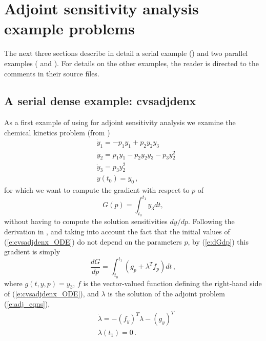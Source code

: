 \section{Adjoint sensitivity analysis example problems}\label{s:adj_examples}

The next three sections describe in detail a serial example () and
two parallel examples ( and ). For details on the other
examples, the reader is directed to the comments in their source files.

\subsection{A serial dense example: cvsadjdenx}\label{ss:cvsadjdenx}

As a first example of using {\cvodes} for adjoint sensitivity analysis
we examine the chemical kinetics problem (from ) 
\begin{equation}\label{e:cvsadjdenx_ODE}
  \begin{split}
    &{\dot y}_1 = -p_1 y_1 + p_2 y_2 y_3   \\
    &{\dot y}_2 =  p_1 y_1 - p_2 y_2 y_3 - p_3 y_2^2 \\
    &{\dot y}_3 =  p_3 y_2^2 \\
    &y(t_0) = y_0 \, ,
  \end{split}
\end{equation}
for which we want to compute the gradient with respect to $p$ of 
\begin{equation}\label{e:cvsadjdenx_G}
  G(p) = \int_{t_0}^{t_1}  y_3  dt ,
\end{equation}
without having to compute the solution sensitivities ${dy}/{dp}$.
Following the derivation in , and taking into account
the fact that the initial values of (\ref{e:cvsadjdenx_ODE}) do not depend on 
the parameters $p$, by (\ref{e:dGdp}) this gradient is simply
\begin{equation}\label{e:cvsadjdenx_dGdp}
\frac{dG}{dp} = \int_{t_0}^{t_1} 
\left( g_p + \lambda^T f_p \right) dt \, ,
\end{equation}
where $g(t,y,p) = y_3$, $f$ is the vector-valued function 
defining the right-hand side of (\ref{e:cvsadjdenx_ODE}), and $\lambda$ is 
the solution of the adjoint problem (\ref{e:adj_eqns}),
\begin{equation}\label{e:cvsadjdenx_ADJ}
  \begin{split}
    &{\dot\lambda} = - (f_y)^T  \lambda - (g_y)^T \\
    &\lambda(t_1) = 0 \, .
  \end{split}
\end{equation}

